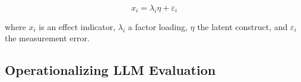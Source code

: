 \begin{equation}\label{formative_model}
    x_i = \lambda_i \eta + \varepsilon_i
\end{equation}

where $x_i$ is an effect indicator, $\lambda_i$ a factor loading, $\eta$ the latent construct, and $\varepsilon_i$ the measurement error.






\subsection{Operationalizing LLM Evaluation}

